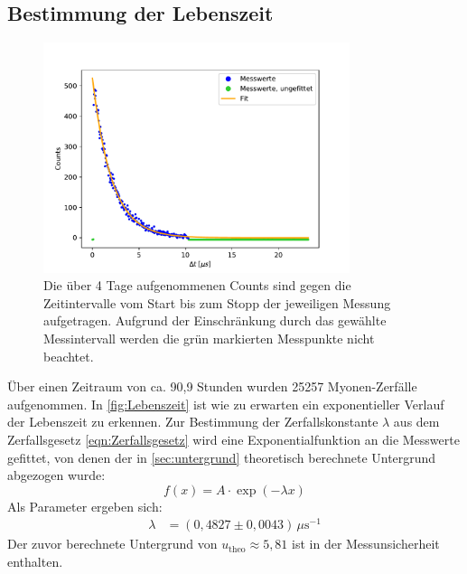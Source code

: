     \newpage
    \subsection{Bestimmung der Lebenszeit}
        \begin{figure}[h]
            \centering
            \includegraphics[width = 0.8\textwidth]{plots/Lebenszeit.pdf}
            \caption{Die über 4 Tage aufgenommenen Counts sind gegen die Zeitintervalle vom Start bis zum Stopp der jeweiligen Messung aufgetragen. Aufgrund der Einschränkung durch das gewählte Messintervall werden die grün markierten Messpunkte nicht beachtet.}
            \label{fig:Lebenszeit}
        \end{figure}

        \FloatBarrier

        Über einen Zeitraum von ca. 90,9 Stunden wurden 25257 Myonen-Zerfälle aufgenommen. In \autoref{fig:Lebenszeit} ist wie zu erwarten ein exponentieller Verlauf der Lebenszeit zu erkennen. Zur Bestimmung der Zerfallskonstante $\lambda$ aus dem Zerfallsgesetz \eqref{eqn:Zerfallsgesetz} wird eine Exponentialfunktion an die Messwerte gefittet, von denen der in \autoref{sec:untergrund} theoretisch berechnete Untergrund abgezogen wurde:
        \begin{equation*}
            f(x) = A \cdot \exp\left(-\lambda x\right)
        \end{equation*}
        Als Parameter ergeben sich:
        \begin{align*}
            \lambda &= (0,4827 \pm 0,0043) \, \mu\text{s}^{-1}
        \end{align*}
        Der zuvor berechnete Untergrund von $u_{\text{theo}} \approx 5,81$ ist in der Messunsicherheit enthalten.

